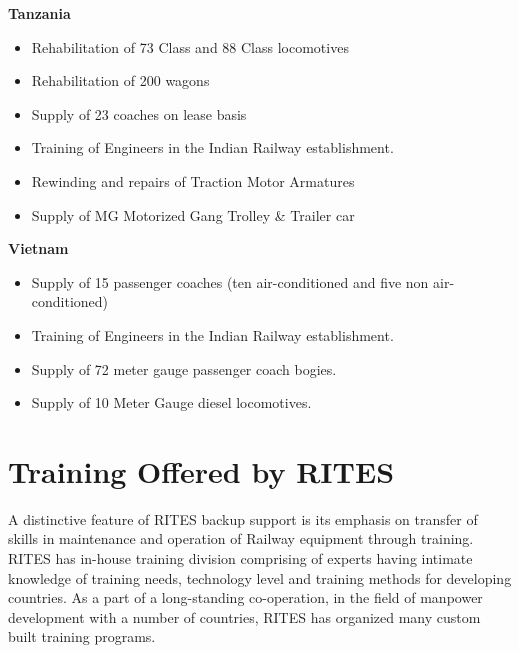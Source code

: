 \bigskip

{\color[rgb]{0.0,0.0,0.039215688}
\textbf{Tanzania\ \ }}


\bigskip

\begin{itemize}
\item {\color[rgb]{0.0,0.0,0.039215688}
Rehabilitation of 73 Class and 88 Class locomotives }
\item {\color[rgb]{0.0,0.0,0.039215688}
Rehabilitation of 200 wagons }
\item {\color[rgb]{0.0,0.0,0.039215688}
Supply of 23 coaches on lease basis}
\item {\color[rgb]{0.0,0.0,0.039215688}
Training of Engineers in the Indian Railway establishment.}
\item {\color[rgb]{0.0,0.0,0.039215688}
Rewinding and repairs of Traction Motor Armatures}
\item {\color[rgb]{0.0,0.0,0.039215688}
Supply of MG Motorized Gang Trolley \& Trailer car }
\end{itemize}

\bigskip

{\color[rgb]{0.0,0.0,0.039215688}
\textbf{Vietnam}}


\bigskip

\begin{itemize}
\item {\color[rgb]{0.0,0.0,0.039215688}
Supply of 15 passenger coaches (ten air-conditioned and five non air-conditioned)}
\item {\color[rgb]{0.0,0.0,0.039215688}
Training of Engineers in the Indian Railway establishment.}
\item {\color[rgb]{0.0,0.0,0.039215688}
Supply of 72 meter gauge passenger coach bogies.}
\item {\color[rgb]{0.0,0.0,0.039215688}
Supply of 10 Meter Gauge diesel locomotives. \ }
\end{itemize}






\section{Training Offered by RITES}


\bigskip

{\color[rgb]{0.0,0.0,0.039215688}
A distinctive feature of RITES backup support is its emphasis on transfer of skills in maintenance and operation of
Railway equipment through training. RITES has in-house training division comprising of experts having intimate
knowledge of training needs, technology level and training methods for developing countries. As a part of a
long-standing co-operation, in the field of manpower development with a number of countries, RITES has organized many
custom built training programs.}


